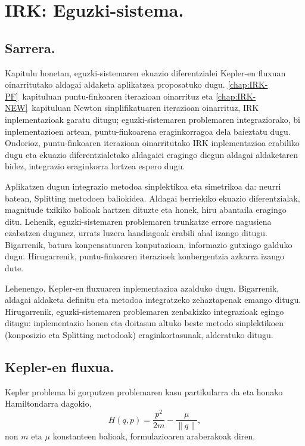 \chapter{IRK: Eguzki-sistema.}


\section{Sarrera.}
  

Kapitulu honetan, eguzki-sistemaren ekuazio diferentzialei Kepler-en fluxuan oinarritutako aldagai aldaketa aplikatzea proposatuko dugu. \ref{chap:IRK-PF}~kapituluan puntu-finkoaren iterazioan oinarrituz eta \ref{chap:IRK-NEW}~kapituluan Newton sinplifikatuaren iterazioan oinarrituz, IRK inplementazioak garatu ditugu; eguzki-sistemaren problemaren integraziorako, bi inplementazioen artean, puntu-finkoarena eraginkorragoa dela baieztatu dugu. Ondorioz, puntu-finkoaren iterazioan oinarritutako IRK inplementazioa erabiliko dugu eta  ekuazio diferentzialetako aldagaiei eragingo diegun aldagai aldaketaren bidez, integrazio eraginkorra lortzea espero dugu.  

Aplikatzen dugun integrazio metodoa sinplektikoa eta simetrikoa da: neurri batean, Splitting metodoen baliokidea. Aldagai berriekiko ekuazio diferentzialak, magnitude txikiko balioak hartzen dituzte eta honek, hiru abantaila eragingo ditu. Lehenik, eguzki-sistemaren problemaren trunkatze errore nagusiena ezabatzen dugunez, urrats luzera handiagoak erabili ahal izango ditugu. Bigarrenik, batura konpensatuaren konputazioan, informazio gutxiago galduko dugu. Hirugarrenik, puntu-finkoaren iterazioek konbergentzia azkarra izango dute. 

Lehenengo, Kepler-en fluxuaren inplementazioa azalduko dugu. Bigarrenik, aldagai aldaketa definitu eta metodoa integratzeko zehaztapenak emango ditugu. Hirugarrenik, eguzki-sistemaren problemaren zenbakizko integrazioak egingo ditugu: inplementazio honen eta doitasun altuko beste metodo sinplektikoen (konposizio eta Splitting metodoak) eraginkortasunak, alderatuko ditugu.     

 

\section{Kepler-en fluxua.}
   
   
Kepler problema bi gorputzen problemaren kasu partikularra da eta  honako Hamiltondarra dagokio,
\begin{equation}
\label{eq: hamkepler}
H(q,p)=\frac{p^2}{2m}-\frac{\mu}{\|q\|},
\end{equation}
non $m$ eta $\mu$ konstanteen balioak, formulazioaren araberakoak diren.

